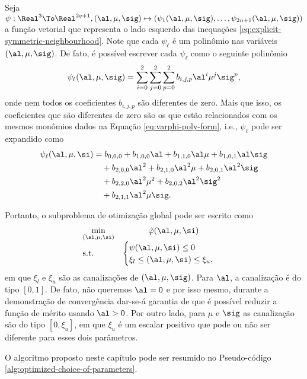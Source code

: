 Seja $\psi:\Real^3 \To \Real^{2q+1}, (\al,\mu,\sig)\mapsto
(\psi_1(\al,\mu,\sig),\ldots,\psi_{2n+1}(\al,\mu,\sig))$ a função vetorial que
representa o lado esquerdo das inequações
\eqref{eq:explicit-symmetric-neighbourhood}.
Note que cada  $\psi_\ell$ é um polinômio nas variáveis $(\al,\mu,\sig)$. De
fato,	 é possível escrever cada $\psi_\ell$ como o seguinte polinômio
\[
\psi_\ell(\al,\mu,\sig) = \sum_{i=0}^2\sum_{j=0}^2\sum_{p=0}^2b_{
i,j,p}\al^i\mu^j\sig^p, \] onde nem todos os coeficientes  $b_{i,j,p}$
são  diferentes de zero. Mais que isso, os coeficientes que são diferentes de
zero são os que estão relacionados com os mesmos monômios dados na Equação
\eqref{eq:varphi-poly-form}, i.e., $\psi_\ell$ pode ser expandido como
\begin{equation}
\begin{aligned}
\psi_\ell(\al,\mu,\si) & = 	b_{0,0,0} + b_{1,0,0}\al + b_{1,1,0}\al\mu + 
b_{1,0,1}\al\sig  
\\
&\quad + b_{2,0,0}\al^2
 + b_{2,1,0}\al^2\mu   + b_{2,0,1}\al^2\sig\\ 
& \quad 	 + b_{2,2,0}\al^2\mu^2 + 	b_{2,0,2}\al^2\sig^2\\ 
& \quad + b_{2,1,1}\al^2\mu\sig.
\end{aligned}
\label{eq:psi-poly-form}
\end{equation}


Portanto, o subproblema de otimização global pode ser escrito como
\begin{equation}
	\begin{array}{lc}
\displaystyle \min_{(\al,\mu,\si)} & \hat\varphi(\al,\mu,\si) \\
\text{s.t.} &\begin{cases} \psi(\al,\mu,\si)\leq 0 \\
				 \xi_l\leq (\al,\mu,\si) \leq \xi_u,
				 	
				 \end{cases}\
\end{array}
\label{eq:pop-subproblem}
\end{equation}
em que  $\xi_l$ e $\xi_u$ são as canalizações de  $(\al,\mu,\sig)$. Para
$\al$, a canalização é do tipo $[0,1]$.
De fato, não queremos $\al=0$ e por isso mesmo,  durante a
demonstração de convergência dar-se-á garantia de que é possível reduzir a
função de mérito usando $\al>0$.
Por outro lado, para $\mu$ e $\sig$ as canalização são do tipo $[0,\xi_u]$, em que $\xi_u$ é um escalar positivo que pode ou não ser
diferente para esses dois parâmetros.

 
O algoritmo proposto neste capítulo pode ser resumido no Pseudo-código
\ref{alg:optimized-choice-of-parameters}.

